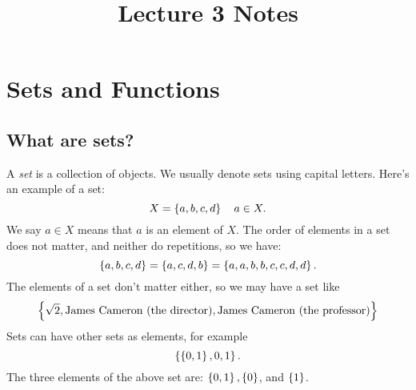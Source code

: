 \documentclass[class=article, crop=false]{standalone}
\title{Lecture 3 Notes}
\begin{document}
  \maketitle
  \newpage
  \section{Sets and Functions}
  \subsection{What are sets?}
   A \emph{set} is a collection of objects. We usually denote sets using capital letters. Here's an example of a set:
  \[
    X = \left\{a, b, c, d\right\} \quad a\in X.
  \]
  We say $a \in X$ means that $a$ is an element of $X$. The order of elements in a set does not matter, and neither do repetitions, so we have:
  \[
    \left\{a, b, c, d\right\} = \left\{a, c, d, b\right\} = \left\{a, a, b, b, c, c, d, d\right\}.
  \]
  The elements of a set don't matter either, so we may have a set like
  \[
    \left\{\sqrt{2}, \text{James Cameron (the director)}, \text{James Cameron (the professor)}\right\}
  \]
  Sets can have other sets as elements, for example
  \[
    \left\{\left\{0, 1\right\}, 0, 1\right\}.
  \]
  The three elements of the above set are: $\left\{0, 1\right\}, \left\{0\right\}$, and $\left\{1\right\}$.
\end{document}
